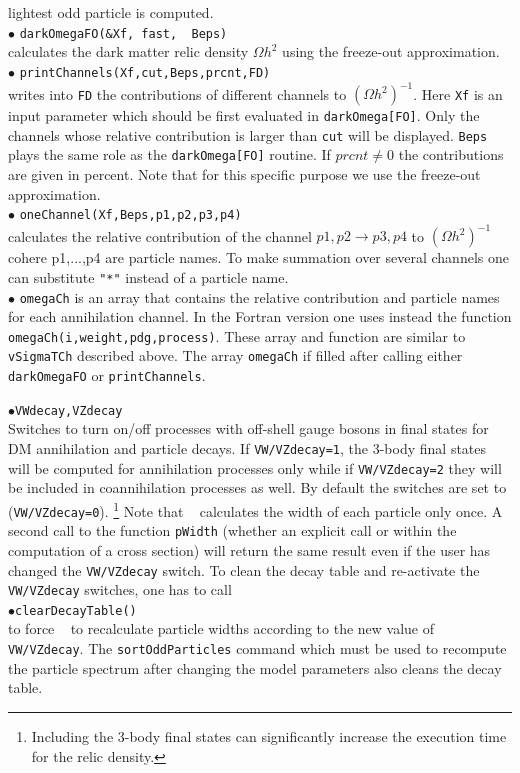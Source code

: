 \documentclass[12pt,a4paper]{article}
\begin{document}
lightest odd particle is computed.\\
\noindent
$\bullet$ \verb|darkOmegaFO(&Xf, fast,  Beps)|\\
calculates the  dark matter relic density $\Omega h^2$ using the freeze-out approximation.\\
\noindent
$\bullet$ \verb|printChannels(Xf,cut,Beps,prcnt,FD)|\\   
writes into \verb|FD| the  contributions  of different channels to $(\Omega
h^2)^{-1}$. Here \verb|Xf| is an input parameter which should
be first evaluated in \verb|darkOmega[FO]|. Only  the channels whose
relative contribution is larger than  \verb|cut| will be displayed. \verb|Beps|
plays the same role as the \verb|darkOmega[FO]| routine.
If $prcnt\ne 0$ the contributions are given in percent.
Note that  for this specific purpose  we use the
freeze-out approximation.\\
$\bullet$ \verb|oneChannel(Xf,Beps,p1,p2,p3,p4)|\\   
calculates the relative   contribution of the  channel $ p1,p2 \to p3,p4$
to $(\Omega h^2)^{-1}$  cohere  p1,...,p4 are particle names.  To make
summation over several channels one can substitute  \verb|"*"| instead 
of  a particle name.\\
\noindent
$\bullet$ \verb|omegaCh| is an array that contains the relative contribution and particle names for each
annihilation channel. In the Fortran version one uses instead
the function\\
\noindent\verb|omegaCh(i,weight,pdg,process)|. These array and function
are similar to {\tt vSigmaTCh} described above. The array {\tt omegaCh} if filled after calling either
{\tt darkOmegaFO} or {\tt printChannels}. 

\noindent
$\bullet$\verb|VWdecay,VZdecay|\\
Switches to turn on/off  processes with off-shell gauge bosons in final states for DM annihilation and particle decays.
If \verb|VW/VZdecay=1|, the  3-body final states will be computed for annihilation processes only while 
if \verb|VW/VZdecay=2| they will be included in coannihilation processes as well.
By  default  the switches are set to (\verb|VW/VZdecay=0|). \footnote{Including the 3-body final states can significantly increase the execution time for the relic density.}
Note that \micro~ calculates the width of each particle only once.  A second call to the function \verb|pWidth| (whether an explicit call or within the computation of a cross section)   will return the same result  even if the user has changed the {\tt VW/VZdecay} switch.  
To clean the decay table and re-activate the {\tt VW/VZdecay} switches,  one has to  call\\ 
$\bullet$\verb|clearDecayTable()| \\
to force \micro~ to recalculate particle widths according to the new value of {\tt VW/VZdecay}. 
The   {\tt sortOddParticles} command which must be used 
to recompute the particle spectrum after changing the model parameters also cleans  the decay table.
\end{document}
